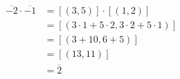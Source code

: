 \documentclass[preview]{standalone}
\begin{document}
\begin{align*}
\overline{-2} \cdot \overline{-1} &= \left[(3, 5)\right] \cdot \left[(1, 2)\right] \\ &= \left[(3 \cdot 1 + 5 \cdot 2, 3 \cdot 2 + 5 \cdot 1)\right] \\ &= \left[(3 + 10, 6 + 5)\right] \\ &= \left[(13, 11)\right] \\ &= \overline{2} \\
\end{align*}
\end{document}

